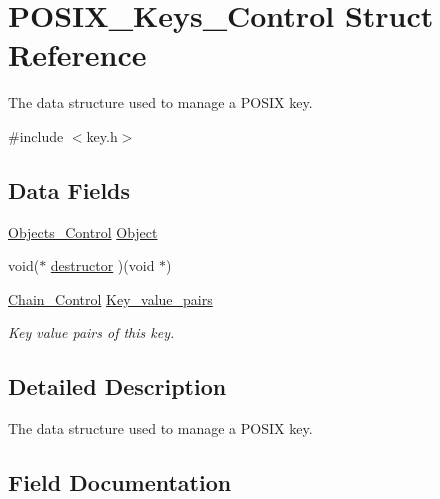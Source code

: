 \hypertarget{structPOSIX__Keys__Control}{}\section{P\+O\+S\+I\+X\+\_\+\+Keys\+\_\+\+Control Struct Reference}
\label{structPOSIX__Keys__Control}


The data structure used to manage a P\+O\+S\+IX key.  




{\ttfamily \#include $<$key.\+h$>$}

\subsection*{Data Fields}
\begin{DoxyCompactItemize}
\item 
\mbox{\hyperlink{structObjects__Control}{Objects\+\_\+\+Control}} \mbox{\hyperlink{structPOSIX__Keys__Control_a75ad1fd494b50ddb38e5c4e89cacfe9f}{Object}}
\item 
void($\ast$ \mbox{\hyperlink{structPOSIX__Keys__Control_a09f25647bb0ccd6e747618488b2d040a}{destructor}} )(void $\ast$)
\item 
\mbox{\label{structPOSIX__Keys__Control_a04a4938e8f1eb2cf354b3bf5f08fd0ab}} 
\mbox{\hyperlink{unionChain__Control}{Chain\+\_\+\+Control}} \mbox{\hyperlink{structPOSIX__Keys__Control_a04a4938e8f1eb2cf354b3bf5f08fd0ab}{Key\+\_\+value\+\_\+pairs}}
\begin{DoxyCompactList}\small\item\em Key value pairs of this key. \end{DoxyCompactList}\end{DoxyCompactItemize}


\subsection{Detailed Description}
The data structure used to manage a P\+O\+S\+IX key. 

\subsection{Field Documentation}
\mbox{\label{structPOSIX__Keys__Control_a09f25647bb0ccd6e747618488b2d040a}} 
